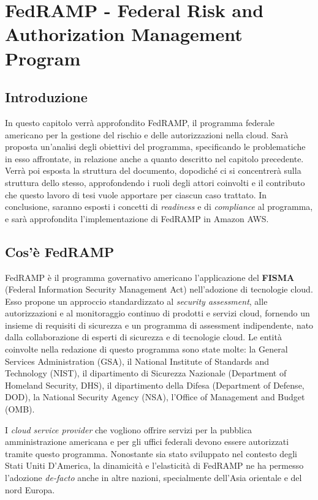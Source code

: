 \documentclass[../main.tex]{subfiles}
\begin{document}
\chapter{FedRAMP - Federal Risk and Authorization Management Program}
\section{Introduzione}
In questo capitolo verrà approfondito FedRAMP, il programma federale americano per la gestione del rischio e delle autorizzazioni nella cloud.
Sarà proposta un'analisi degli obiettivi del programma, specificando le problematiche in esso affrontate, in relazione anche a quanto descritto nel capitolo precedente.
Verrà poi esposta la struttura del documento, dopodiché ci si concentrerà sulla struttura dello stesso, approfondendo i ruoli degli attori coinvolti e il contributo che questo lavoro di tesi vuole apportare per ciascun caso trattato.
In conclusione, saranno esposti i concetti di \textit{readiness} e di \textit{compliance} al programma, e sarà approfondita l'implementazione di FedRAMP in Amazon AWS.

\section{Cos'è FedRAMP}
FedRAMP è il programma governativo americano l'applicazione del \textbf{FISMA} (Federal Information Security Management Act) nell'adozione di tecnologie cloud. %
Esso propone un approccio standardizzato al \textit{security assessment}, alle autorizzazioni e al monitoraggio continuo di prodotti e servizi cloud, fornendo un insieme di requisiti di sicurezza e un programma di assessment indipendente, nato dalla collaborazione di esperti di sicurezza e di tecnologie cloud.
Le entità coinvolte nella redazione di questo programma sono state molte: la General Services Administration (GSA), il National Institute of Standards and Technology (NIST), il dipartimento di Sicurezza Nazionale (Department of Homeland Security, DHS), il dipartimento della Difesa (Department of Defense, DOD), la National Security Agency (NSA), l'Office of Management and Budget (OMB).

I \textit{cloud service provider} che vogliono offrire servizi per la pubblica amministrazione americana e per gli uffici federali devono essere autorizzati tramite questo programma.
Nonostante sia stato sviluppato nel contesto degli Stati Uniti D'America, la dinamicità e l'elasticità di FedRAMP ne ha permesso l'adozione \textit{de-facto} anche in altre nazioni, specialmente dell'Asia orientale e del nord Europa.
\end{document}
